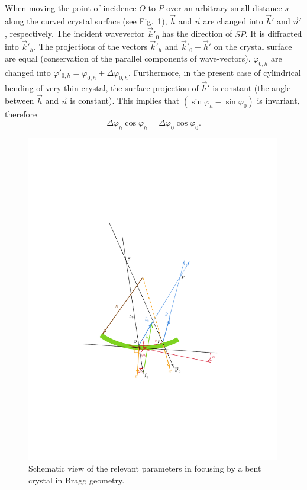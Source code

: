 \documentclass[preprint]{iucr}              %
\newcommand{\inred}[1]{{\color{red}#1}}
\begin{document}
When moving the point of incidence $O$ to $P$ over an arbitrary small distance $s$ along the curved crystal surface (see Fig.~\ref{fig:vectors}), 
$\vec h$ and $\vec n$ are changed into $\vec h'$
and $\vec n'$, respectively. The incident wavevector $\vec k'_{0}$ has the direction of $\overline{SP}$. It is  diffracted into $\vec k'_{h}$. 
The projections of the vectors $\vec k'_{h}$ and $\vec k'_{0}+\vec h'$ on the crystal surface are equal (conservation of the parallel components of wave-vectors).
$\varphi_{0,h}$ are changed into $\varphi'_{0,h}=\varphi_{0,h}+\Delta \varphi_{0,h}$.
Furthermore, in the present case of cylindrical bending of very thin crystal, the surface projection of $\vec h'$ is constant (the angle between $\vec h$ and $\vec n$ is constant).
This implies that $(\sin \varphi_h - \sin \varphi_0)$ is invariant, therefore
\begin{equation}
\label{eq:invariant}
    \Delta \varphi_h \cos\varphi_h = \Delta \varphi_0 \cos\varphi_0.
\end{equation}

\begin{figure}
\label{fig:vectors}
\caption{Schematic view of the relevant parameters in focusing by a bent crystal in Bragg geometry.
}
\includegraphics[width=0.99\textwidth,trim=4cm 6cm 5cm 10cm,clip=true]{fig2.pdf}
\end{figure}
\end{document}
